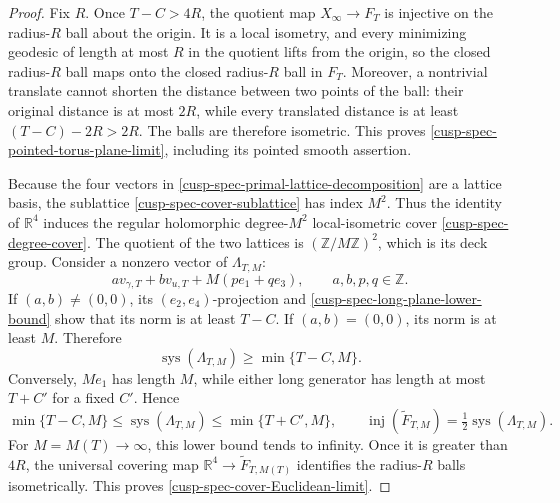 \begin{proof}
Fix \(R\).  Once \(T-C>4R\), the quotient map
\(X_\infty\to F_T\) is injective on the radius-\(R\) ball about the origin.
It is a local isometry, and every minimizing geodesic of length at most
\(R\) in the quotient lifts from the origin, so the closed radius-\(R\)
ball maps onto the closed radius-\(R\) ball in \(F_T\).  Moreover, a
nontrivial translate cannot
shorten the distance between two points of the ball: their original distance
is at most \(2R\), while every translated distance is at least
\((T-C)-2R>2R\).  The balls are therefore isometric.  This
proves \cref{cusp-spec-pointed-torus-plane-limit}, including its pointed
smooth assertion.

Because the four vectors in
\cref{cusp-spec-primal-lattice-decomposition} are a lattice basis, the
sublattice \cref{cusp-spec-cover-sublattice} has index \(M^2\).  Thus the
identity of \(\mathbb R^4\) induces the regular holomorphic degree-\(M^2\)
local-isometric cover \cref{cusp-spec-degree-cover}.  The quotient of the two
lattices is \((\mathbb Z/M\mathbb Z)^2\), which is its deck group.  Consider
a nonzero vector of
\(\Lambda_{T,M}\):
\begin{equation}
 av_{\gamma,T}+bv_{u,T}+M(pe_1+qe_3),
 \qquad a,b,p,q\in\mathbb Z.
 \label{cusp-spec-general-cover-vector}
\end{equation}
If \((a,b)\ne(0,0)\), its \((e_2,e_4)\)-projection and
\cref{cusp-spec-long-plane-lower-bound} show that its norm is at least
\(T-C\).  If \((a,b)=(0,0)\), its norm is at least \(M\).  Therefore
\begin{equation}
 \operatorname{sys}(\Lambda_{T,M})\ge\min\{T-C,M\}.
 \label{cusp-spec-cover-systole}
\end{equation}
Conversely, \(Me_1\) has length \(M\), while either long generator has
length at most \(T+C'\) for a fixed \(C'\).  Hence
\begin{equation}
 \min\{T-C,M\}
 \le\operatorname{sys}(\Lambda_{T,M})
 \le\min\{T+C',M\},
 \qquad
 \operatorname{inj}(\widetilde F_{T,M})
 =\tfrac12\operatorname{sys}(\Lambda_{T,M}).
 \label{cusp-spec-cover-systole-two-sided}
\end{equation}
For \(M=M(T)\to\infty\), this lower bound tends to infinity.  Once it is
greater than \(4R\), the universal covering map
\(\mathbb R^4\to\widetilde F_{T,M(T)}\) identifies the radius-\(R\) balls
isometrically.  This proves \cref{cusp-spec-cover-Euclidean-limit}.


\end{proof}
